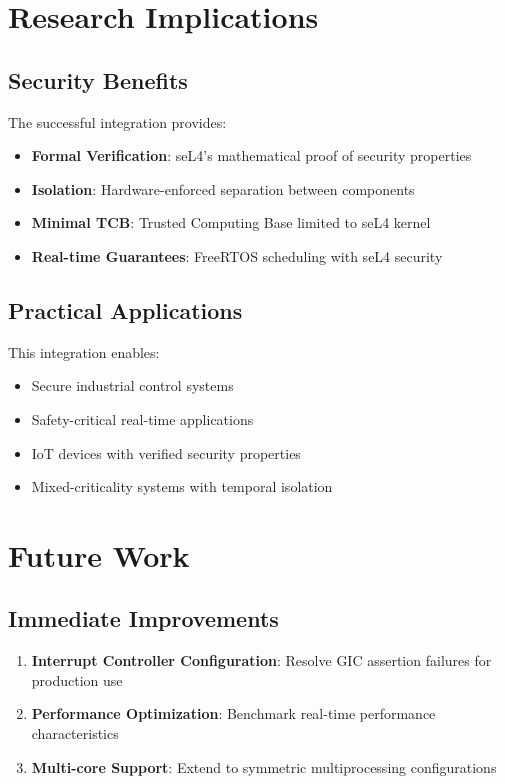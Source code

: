 \documentclass[12pt]{article}
\begin{document}
\section{Research Implications}

\subsection{Security Benefits}

The successful integration provides:
\begin{itemize}
\item \textbf{Formal Verification}: seL4's mathematical proof of security properties
\item \textbf{Isolation}: Hardware-enforced separation between components
\item \textbf{Minimal TCB}: Trusted Computing Base limited to seL4 kernel
\item \textbf{Real-time Guarantees}: FreeRTOS scheduling with seL4 security
\end{itemize}

\subsection{Practical Applications}

This integration enables:
\begin{itemize}
\item Secure industrial control systems
\item Safety-critical real-time applications
\item IoT devices with verified security properties
\item Mixed-criticality systems with temporal isolation
\end{itemize}

\section{Future Work}

\subsection{Immediate Improvements}

\begin{enumerate}
\item \textbf{Interrupt Controller Configuration}: Resolve GIC assertion failures for production use
\item \textbf{Performance Optimization}: Benchmark real-time performance characteristics
\item \textbf{Multi-core Support}: Extend to symmetric multiprocessing configurations
\end{enumerate}
\end{document}
